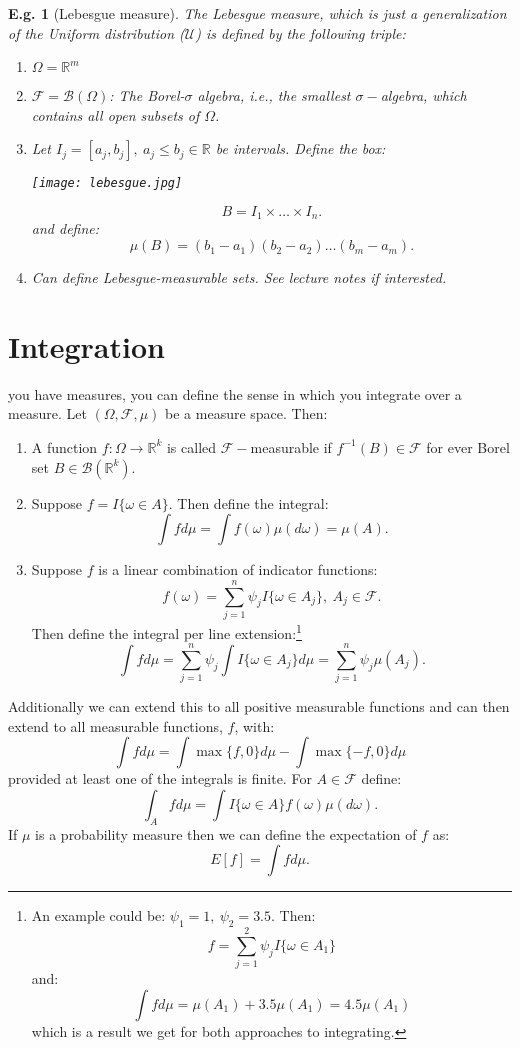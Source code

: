 \documentclass{tufte-book}
\theoremstyle{mytheoremstyle}
\theoremstyle{mylemstyle}
\theoremstyle{mydefstyle}
\newtheorem*{ex}{E.g.}
\begin{document}
\begin{ex}[Lebesgue measure] The Lebesgue measure, which is just a generalization of the Uniform distribution (\(\mathcal{U}\)) is defined by the following triple:
	\begin{enumerate}
		\item \(\Omega = \mathbb{R}^m\)
		\item \(\mathcal{F} = \mathcal{B}(\Omega)\): The Borel-\(\sigma\) algebra, i.e., the smallest \(\sigma-\)algebra, which contains all open subsets of \(\Omega\).
		\item Let \(I_j = [a_j, b_j],\ a_j \le b_j \in \mathbb{R}\) be intervals. Define the box:\begin{marginfigure}
	\texttt{[image: lebesgue.jpg]}
	\caption{Henri Lebesgue wearing an early prototype of Morpheus's sunglasses in the Matrix.}
\end{marginfigure}
			\[B = I_1 \times\dots\times I_n \text{.}\]
		and define:
			\[\mu(B) = (b_1 - a_1)(b_2 - a_2)\dots(b_m - a_m) \text{.}\]
		\item Can define Lebesgue-measurable sets. See lecture notes if interested.
	\end{enumerate}
\end{ex}

\section{Integration}
 you have measures, you can define the sense in which you integrate over a measure. Let \((\Omega, \mathcal{F}, \mu)\) be a measure space. Then:
	\begin{enumerate}
		\item A function \(f: \Omega \rightarrow \mathbb{R}^k\) is called \(\mathcal{F}-\)measurable if \(f^{-1}(B) \in \mathcal{F}\) for ever Borel set \(B \in \mathcal{B}(\mathbb{R}^k)\).
		\item Suppose \(f = I\{\omega \in A\}\). Then define the integral:
			\[\int f d\mu = \int f(\omega)\mu(d\omega) = \mu(A) \text{.}\]
		\item Suppose \(f\) is a linear combination of indicator functions:
			\[f(\omega) = \sum_{j=1}^n \psi_j I\{\omega \in A_j\},\ A_j \in \mathcal{F} \text{.}\]
		Then define the integral per line extension:\footnote{An example could be: \(\psi_1 = 1,\ \psi_2 = 3.5\). Then: \[f = \sum_{j=1}^2 \psi_j I\{\omega \in A_1\}\] and:
			\[\int f d \mu = \mu(A_1) + 3.5\mu(A_1) = 4.5\mu(A_1)\]
		which is a result we get for both approaches to integrating.}
			\[\int f d\mu = \sum_{j=1}^n \psi_j \int I\{\omega \in A_j\} d\mu = \sum_{j=1}^n \psi_j \mu(A_j) \text{.}\]
	\end{enumerate}
Additionally we can extend this to all positive measurable functions and can then extend to all measurable functions, \(f\), with:
	\[\int f d\mu = \int \max\{f, 0\} d\mu - \int \max\{-f, 0\}d\mu\]
provided at least one of the integrals is finite. For \(A \in \mathcal{F}\) define:
	\[\int_A f d\mu = \int I\{\omega \in A\}f(\omega)\mu(d\omega) \text{.}\]
If \(\mu\) is a probability measure then we can define the expectation of \(f\) as:
	\[E[f] = \int f d\mu \text{.}\]
\end{document}
